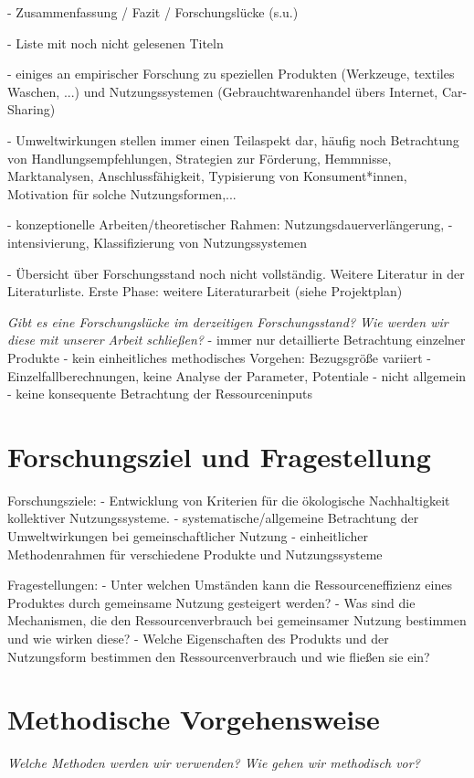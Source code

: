 \documentclass[11pt, titlepage=true]{scrartcl} %
\newcommand{\was}[1]{\small\textit{#1}}
\begin{document}
- Zusammenfassung / Fazit / Forschungslücke (s.u.)

- Liste mit noch nicht gelesenen Titeln

- einiges an empirischer Forschung zu speziellen Produkten (Werkzeuge, textiles
Waschen, ...) und Nutzungssystemen (Gebrauchtwarenhandel übers Internet,
Car-Sharing) 

- Umweltwirkungen stellen immer einen Teilaspekt dar, häufig noch
Betrachtung von Handlungsempfehlungen, Strategien zur Förderung, Hemmnisse,
Marktanalysen, Anschlussfähigkeit, Typisierung von Konsument*innen, Motivation
für solche Nutzungsformen,...  

- konzeptionelle Arbeiten/theoretischer Rahmen:
Nutzungsdauerverlängerung, -intensivierung, Klassifizierung von Nutzungssystemen
 

- Übersicht über Forschungsstand noch nicht vollständig. Weitere Literatur in der Literaturliste. Erste Phase: weitere Literaturarbeit (siehe Projektplan)

 \was{Gibt es eine Forschungslücke im derzeitigen Forschungsstand? Wie werden wir
 diese mit unserer Arbeit schließen?}
 - immer nur detaillierte Betrachtung einzelner Produkte
 - kein einheitliches methodisches Vorgehen: Bezugsgröße variiert
 - Einzelfallberechnungen, keine Analyse der Parameter, Potentiale
 - nicht allgemein
 - keine konsequente Betrachtung der Ressourceninputs
 
 
\section{Forschungsziel und Fragestellung}

Forschungsziele:
- Entwicklung von Kriterien für die ökologische Nachhaltigkeit kollektiver Nutzungssysteme.
- systematische/allgemeine Betrachtung der Umweltwirkungen bei gemeinschaftlicher Nutzung
- einheitlicher Methodenrahmen für verschiedene Produkte und Nutzungssysteme

Fragestellungen:
- Unter welchen Umständen kann die Ressourceneffizienz eines Produktes durch gemeinsame Nutzung gesteigert werden?
	- Was sind die Mechanismen, die den Ressourcenverbrauch bei gemeinsamer Nutzung bestimmen und wie wirken diese?
	- Welche Eigenschaften des Produkts und der Nutzungsform bestimmen den Ressourcenverbrauch und wie fließen sie ein?

\section{Methodische Vorgehensweise}
\was{Welche Methoden werden wir verwenden? Wie gehen wir methodisch vor?}
\end{document}
